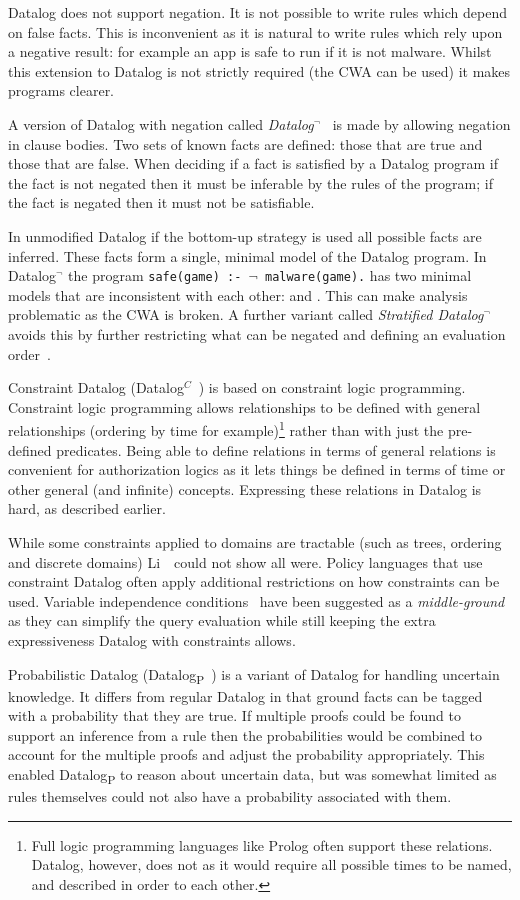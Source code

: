 \documentclass[thesis.tex]{subfiles}
\begin{document}
Datalog does not support negation. It is not possible to write
rules which depend on false facts.  This is inconvenient as it is
natural to write rules which rely upon a negative result: for example
an app is safe to run if it is not malware.  Whilst this extension to Datalog is
not strictly required (the \ac{CWA} can be used) it makes programs clearer.

A version of Datalog with negation called
\emph{Datalog$^\lnot$}~\cite{ceri_what_1989} is made by allowing negation in clause
bodies. Two sets of known facts are defined: those that are true and those that
are false.  When deciding if a fact is satisfied by a Datalog program if the
fact is not negated then it must be inferable by the rules of the program; if
the fact is negated then it must not be satisfiable.  

In unmodified Datalog if the bottom-up strategy
is used all possible facts are inferred. These facts form a single, minimal
model of the Datalog program.  In Datalog$^\lnot$ the program \texttt{safe(game)
:- $\mathsf\lnot$ malware(game).} has two minimal models that are inconsistent
with each other:  and .  This can make
analysis problematic as the \ac{CWA} is broken. A further variant called
\emph{Stratified Datalog$^\lnot$} avoids this by further restricting what can be
negated and defining an evaluation order~\cite{minker_foundations_2014}.

Constraint Datalog (Datalog$^C$~\cite{li_datalog_2003}) is based
on constraint logic programming.  Constraint logic programming allows
relationships to be defined with general relationships (ordering by time
for example)\footnote{Full logic programming languages like Prolog often
support these relations. Datalog, however, does not as it would require all
possible times to be named, and described in order to each other.} rather than with just the pre-defined predicates.  Being able to
define relations in terms of general relations is convenient for
authorization logics as it lets things be defined in terms of time or
other general (and infinite) concepts. 
Expressing these relations in Datalog is hard, as described earlier.

While some constraints applied to domains are tractable (such as
trees, ordering and discrete domains) Li~\etal{}~could not show
all were.  Policy languages that use constraint Datalog often apply
additional restrictions on how constraints can be used.  Variable independence
conditions~\cite{chomicki_variable_2003} have been suggested as a \emph{middle-ground}
as they can simplify the query evaluation while still keeping the extra
expressiveness Datalog with constraints allows.

Probabilistic Datalog
(Datalog\textsubscript{P}~\cite{fuhr_probabilistic_1995}) is a variant
of Datalog for handling uncertain knowledge.  It differs from regular
Datalog in that ground facts can be tagged with a probability that
they are true.  If multiple proofs could be found to support an
inference from a rule then the probabilities would be combined to
account for the multiple proofs and adjust the probability
appropriately. This enabled Datalog\textsubscript{P} to reason about
uncertain data, but was somewhat limited as rules themselves could not
also have a probability associated with them.
\end{document}
